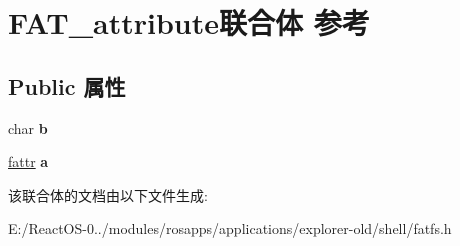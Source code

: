 \hypertarget{union_f_a_t__attribute}{}\section{F\+A\+T\+\_\+attribute联合体 参考}
\label{union_f_a_t__attribute}
\subsection*{Public 属性}
\begin{DoxyCompactItemize}
\item 
\mbox{\label{union_f_a_t__attribute_ad6ea29a32224606534840548d5bfd067}} 
char {\bfseries b}
\item 
\mbox{\label{union_f_a_t__attribute_a453874e5e74deaf4fa4d5fe27f66c219}} 
\hyperlink{structfattr}{fattr} {\bfseries a}
\end{DoxyCompactItemize}


该联合体的文档由以下文件生成\+:\begin{DoxyCompactItemize}
\item 
E\+:/\+React\+O\+S-\/0../modules/rosapps/applications/explorer-\/old/shell/fatfs.\+h\end{DoxyCompactItemize}
